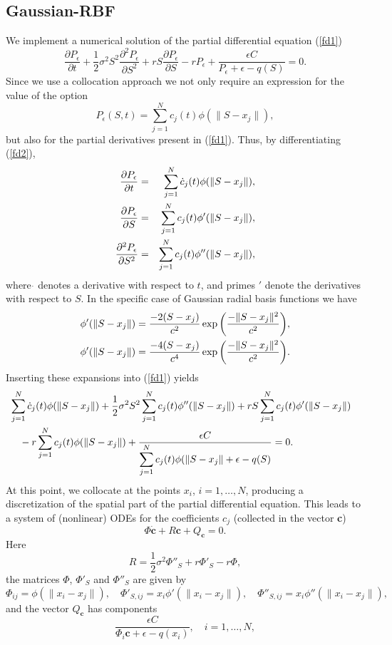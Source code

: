 \documentclass[12pt]{article}
\numberwithin{equation}{subsection} %
\begin{document}
\subsection{Gaussian-RBF}

We implement a numerical solution of the partial differential
equation (\ref{fd1})
$$
\frac{\partial P_\epsilon}{\partial
t}+\frac{1}{2}\sigma^2S^2\frac{\partial^2 P_\epsilon}{\partial S^2}
+rS\frac{\partial P_\epsilon}{\partial S}-rP_\epsilon+\frac{\epsilon
C }{P_\epsilon + \epsilon - q(S)}=0.
$$
Since we use a collocation approach we not only require an
expression for the value of the option
\begin{equation}\label{RBFExpansion}
P_\epsilon (S,t) = \sum_{j=1}^N c_j(t) \phi(\|S-x_j\|),
\end{equation}
but also for the partial derivatives present in (\ref{fd1}). Thus,
by differentiating (\ref{fd2}),
\begin{eqnarray*}
\frac{\partial P_\epsilon}{\partial t} & = & \sum_{j=1}^N
\dot{c}_j(t) \phi(\|S-x_j\|), \cr \frac{\partial
P_\epsilon}{\partial S} & = & \sum_{j=1}^N c_j(t) \phi'(\|S-x_j\|),
\cr \frac{\partial^{2} P_\epsilon}{\partial S^{2}} & = &
\sum_{j=1}^N c_j(t) \phi''(\|S-x_j\|),
\end{eqnarray*}
where $\dot{}$ denotes a derivative with respect to $t$, and primes
$'$ denote the derivatives with respect to $S$. In the specific case
of Gaussian radial basis functions we have
\begin{eqnarray*}
 \phi'(\|S-x_j\|)=\frac{-2(S-x_j)}{c^2}\exp{\left(\frac{-\|S-x_j\|^2}{c^2}\right)},\cr
  \phi'(\|S-x_j\|)=\frac{-4(S-x_j)}{c^4}\exp{\left(\frac{-\|S-x_j\|^2}{c^2}\right)}.
\end{eqnarray*}
Inserting these expansions into (\ref{fd1}) yields
\begin{eqnarray*}
& \displaystyle \sum_{j=1}^N \dot{c}_j(t) \phi(\|S-x_j\|) +
\frac{1}{2}\sigma^2 S^2 \sum_{j=1}^N c_j(t) \phi''(\|S-x_j\|) +
rS\sum_{j=1}^N c_j(t) \phi'(\|S-x_j\|)& \cr & \displaystyle \quad -
r \sum_{j=1}^N c_j(t) \phi(\|S-x_j\|) + \frac{\epsilon C
}{\displaystyle \sum_{j=1}^N c_j(t) \phi(\|S-x_j\|+ \epsilon - q(S)}
= 0.&
\end{eqnarray*}
 At this point, we collocate at the points $x_i$,
$i=1,\ldots,N$, producing a discretization of the spatial part of
the partial differential equation. This leads to a  system of
(nonlinear) ODEs for the coefficients $c_j$ (collected in the vector
\textbf{c})
$$
\Phi \dot{\textbf{c}} + R \textbf{c} + Q_{\textbf{c}} = 0.
$$
Here
$$
R = \frac{1}{2} \sigma^2 \Phi''_S + r \Phi'_S - r \Phi,
$$
the matrices $\Phi$, $\Phi'_S$ and $\Phi''_S$ are given by
$$
\Phi_{ij} = \phi(\|x_i-x_j\|), \quad \Phi'_{S,ij} =
x_i\phi'(\|x_i-x_j\|), \quad \Phi''_{S,ij} = x_i\phi''(\|x_i-x_j\|),
$$
and the vector $Q_{\textbf{c}}$ has components
$$
\frac{\epsilon C }{\Phi_i \textbf{c} + \epsilon - q(x_i)}, \quad
i=1,\ldots,N,
$$
\end{document}
